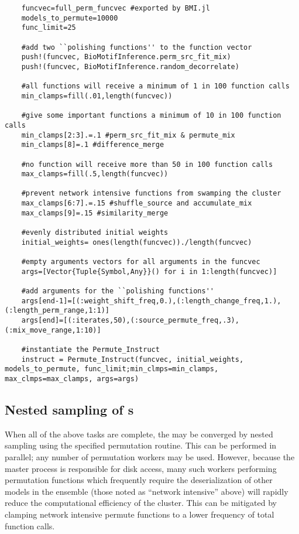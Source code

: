 \begin{verbatim}
    funcvec=full_perm_funcvec #exported by BMI.jl
    models_to_permute=10000
    func_limit=25
    
    #add two ``polishing functions'' to the function vector
    push!(funcvec, BioMotifInference.perm_src_fit_mix) 
    push!(funcvec, BioMotifInference.random_decorrelate)
    
    #all functions will receive a minimum of 1 in 100 function calls
    min_clamps=fill(.01,length(funcvec))

    #give some important functions a minimum of 10 in 100 function calls
    min_clamps[2:3].=.1 #perm_src_fit_mix & permute_mix
    min_clamps[8]=.1 #difference_merge

    #no function will receive more than 50 in 100 function calls
    max_clamps=fill(.5,length(funcvec))

    #prevent network intensive functions from swamping the cluster
    max_clamps[6:7].=.15 #shuffle_source and accumulate_mix
    max_clamps[9]=.15 #similarity_merge
    
    #evenly distributed initial weights
    initial_weights= ones(length(funcvec))./length(funcvec)
    
    #empty arguments vectors for all arguments in the funcvec
    args=[Vector{Tuple{Symbol,Any}}() for i in 1:length(funcvec)]
    
    #add arguments for the ``polishing functions''
    args[end-1]=[(:weight_shift_freq,0.),(:length_change_freq,1.),(:length_perm_range,1:1)]
    args[end]=[(:iterates,50),(:source_permute_freq,.3),(:mix_move_range,1:10)]
    
    #instantiate the Permute_Instruct
    instruct = Permute_Instruct(funcvec, initial_weights, models_to_permute, func_limit;min_clmps=min_clamps, max_clmps=max_clamps, args=args)
\end{verbatim}

\subsection{Nested sampling of \protect{}s}

When all of the above tasks are complete, the  may be converged by nested sampling using the specified permutation routine. This can be performed in parallel; any number of permutation workers may be used. However, because the master process is responsible for disk access, many such workers performing permutation functions which frequently require the deserialization of other models in the ensemble (those noted as ``network intensive'' above) will rapidly reduce the computational efficiency of the cluster. This can be mitigated by clamping network intensive permute functions to a lower frequency of total function calls.

